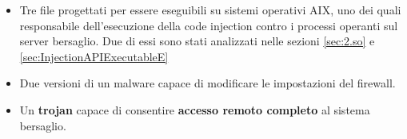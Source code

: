 \documentclass[10pt,a4paper, titlepage]{report}
\begin{document}
\begin{itemize}
\item Tre file progettati per essere eseguibili su sistemi operativi AIX, uno dei quali responsabile dell'esecuzione della code injection contro i processi operanti sul server bersaglio. Due di essi sono stati analizzati nelle sezioni \ref{sec:2.so} e \ref{sec:InjectionAPIExecutableE}

\item Due versioni di un malware capace di modificare le impostazioni del firewall.

\item Un \textbf{trojan} capace di consentire \textbf{accesso remoto completo} al sistema bersaglio.
\end{itemize}
\end{document}
